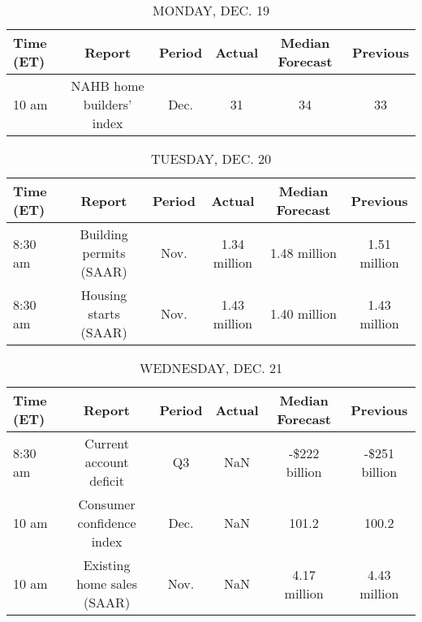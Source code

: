 \documentclass{article}%
\begin{document}
%
\normalsize%


\begin{table}[htbp]%
\caption{MONDAY, DEC. 19}%
\centering%
\begin{adjustbox}{width=1\textwidth}%
\begin{tabular}{lccccc}
\toprule
Time (ET) &                    Report & Period & Actual & Median Forecast & Previous \\
\midrule
    10 am & NAHB home builders' index &   Dec. &     31 &              34 &       33 \\
\bottomrule
\end{tabular}
%
\end{adjustbox}%
\end{table}

%


\begin{table}[htbp]%
\caption{TUESDAY, DEC. 20}%
\centering%
\begin{adjustbox}{width=1\textwidth}%
\begin{tabular}{lccccc}
\toprule
Time (ET) &                  Report & Period &       Actual & Median Forecast &     Previous \\
\midrule
  8:30 am & Building permits (SAAR) &   Nov. & 1.34 million &    1.48 million & 1.51 million \\
  8:30 am &   Housing starts (SAAR) &   Nov. & 1.43 million &    1.40 million & 1.43 million \\
\bottomrule
\end{tabular}
%
\end{adjustbox}%
\end{table}

%


\begin{table}[htbp]%
\caption{WEDNESDAY, DEC. 21}%
\centering%
\begin{adjustbox}{width=1\textwidth}%
\begin{tabular}{lccccc}
\toprule
Time (ET) &                     Report & Period & Actual & Median Forecast &      Previous \\
\midrule
  8:30 am &    Current account deficit &     Q3 &    NaN &   -\$222 billion & -\$251 billion \\
    10 am &  Consumer confidence index &   Dec. &    NaN &           101.2 &         100.2 \\
    10 am & Existing home sales (SAAR) &   Nov. &    NaN &    4.17 million &  4.43 million \\
\bottomrule
\end{tabular}
%
\end{adjustbox}%
\end{table}
\end{document}
